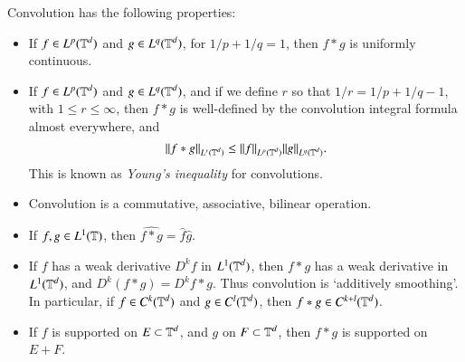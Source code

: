 \begin{theorem}
    Convolution has the following properties:
    \begin{itemize}
        \item If $f \in L^p(\operatorname{\mathbb{T}}^d)$ and $g \in L^q(\operatorname{\mathbb{T}}^d)$, for $1/p + 1/q = 1$, then $f * g$ is uniformly continuous.

        \item If $f \in L^p(\operatorname{\mathbb{T}}^d)$ and $g \in L^q(\operatorname{\mathbb{T}}^d)$, and if we define $r$ so that $1/r = 1/p + 1/q - 1$, with $1 \leq r \leq \infty$, then $f * g$ is well-defined by the convolution integral formula almost everywhere, and
        \[ \| f * g \|_{L^r(\operatorname{\mathbb{T}}^d)} \leq \| f \|_{L^p(\operatorname{\mathbb{T}}^d)} \| g \|_{L^q(\operatorname{\mathbb{T}}^d)}. \]
        This is known as {\it Young's inequality} for convolutions.

        \item Convolution is a commutative, associative, bilinear operation.

        \item If $f,g \in L^1(\operatorname{\mathbb{T}})$, then $\widehat{f * g} = \widehat{f} \widehat{g}$.

        \item If $f$ has a weak derivative $D^kf$ in $L^1(\operatorname{\mathbb{T}}^d)$, then $f * g$ has a weak derivative in $L^1(\operatorname{\mathbb{T}}^d)$, and $D^k(f * g) = D^k f * g$. Thus convolution is `additively smoothing'. In particular, if $f \in C^k(\operatorname{\mathbb{T}}^d)$ and $g \in C^l(\operatorname{\mathbb{T}}^d)$, then $f * g \in C^{k+l}(\operatorname{\mathbb{T}}^d)$.

        \item If $f$ is supported on $E \subset \operatorname{\mathbb{T}}^d$, and $g$ on $F \subset \operatorname{\mathbb{T}}^d$, then $f * g$ is supported on $E + F$.
    \end{itemize}
\end{theorem}
